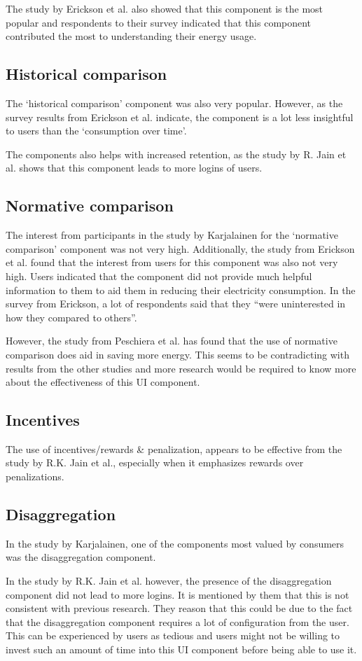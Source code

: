 \documentclass[journal]{vgtc}                %
\begin{document}
The study by Erickson et al. also showed that this component is the most popular and respondents to their survey indicated that this component contributed the most to understanding their energy usage.
\subsection{Historical comparison}
The `historical comparison' component was also very popular. However, as the survey results from Erickson et al. indicate, the component is a lot less insightful to users than the `consumption over time'. 

The components also helps with increased retention, as the study by R. Jain et al. shows that this component leads to more logins of users.
\subsection{Normative comparison}
The interest from participants in the study by Karjalainen for the `normative comparison' component was not very high. 
Additionally, the study from Erickson et al. found that the interest from users for this component was also not very high. Users indicated that the component did not provide much helpful information to them to aid them in reducing their electricity consumption. In the survey from Erickson, a lot of respondents said that they ``were uninterested in how they compared to others''.

However, the study from Peschiera et al. has found that the use of normative comparison does aid in saving more energy. This seems to be contradicting with results from the other studies and more research would be required to know more about the effectiveness of this UI component.
\subsection{Incentives}
The use of incentives/rewards \& penalization, appears to be effective from the study by R.K. Jain et al., especially when it emphasizes rewards over penalizations. %

\subsection{Disaggregation}
In the study by Karjalainen, one of the components most valued by consumers was the disaggregation component. 

In the study by R.K. Jain et al. however, the presence of the disaggregation component did not lead to more logins. It is mentioned by them that this is not consistent with previous research. 
They reason that this could be due to the fact that the disaggregation component requires a lot of configuration from the user. This can be experienced by users as tedious and users might not be willing to invest such an amount of time into this UI component before being able to use it.
\end{document}
